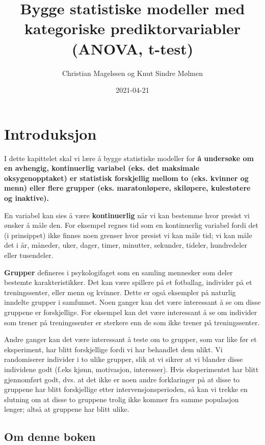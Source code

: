 \documentclass[
]{book}
\title{Bygge statistiske modeller med kategoriske prediktorvariabler (ANOVA, t-test)}
\author{Christian Magelssen og Knut Sindre Mølmen}
\date{2021-04-21}
\begin{document}
\maketitle

{
\setcounter{tocdepth}{1}
\tableofcontents
}
\hypertarget{intro}{%
\chapter{Introduksjon}\label{intro}}

I dette kapittelet skal vi lære å bygge statistiske modeller for \textbf{å undersøke om en avhengig, kontinuerlig variabel (eks. det maksimale oksygenopptaket) er statistisk forskjellig mellom to (eks. kvinner og menn) eller flere grupper (eks. maratonløpere, skiløpere, kulestøtere og inaktive).}

En variabel kan sies å være \textbf{kontinuerlig} når vi kan bestemme hvor presist vi ønsker å måle den. For eksempel regnes tid som en kontinuerlig variabel fordi det (i prinsippet) ikke finnes noen grenser hvor presist vi kan måle tid; vi kan måle det i år, måneder, uker, dager, timer, minutter, sekunder, tideler, hundredeler eller tusendeler.

\textbf{Grupper} defineres i psykologifaget som en samling mennesker som deler bestemte karakteristikker. Det kan være spillere på et fotballag, individer på et treningssenter, eller menn og kvinner. Dette er også eksempler på naturlig inndelte grupper i samfunnet. Noen ganger kan det være interessant å se om disse gruppene er forskjellige. For eksempel kan det være interessant å se om individer som trener på treningssenter er sterkere enn de som ikke trener på treningssenter.

Andre ganger kan det være interessant å teste om to grupper, som var like før et eksperiment, har blitt forskjellige fordi vi har behandlet dem ulikt. Vi randomiserer individer i to ulike grupper, slik at vi sikrer at vi blander disse individene godt (f.eks kjønn, motivasjon, interesser). Hvis eksperimentet har blitt gjennomført godt, dvs. at det ikke er noen andre forklaringer på at disse to gruppene har blitt forskjellige etter intervensjonsperioden, så kan vi trekke en slutning om at disse to gruppene trolig ikke kommer fra samme populasjon lenger; altså at gruppene har blitt ulike.

\hypertarget{om-denne-boken}{%
\section{Om denne boken}\label{om-denne-boken}}
\end{document}
